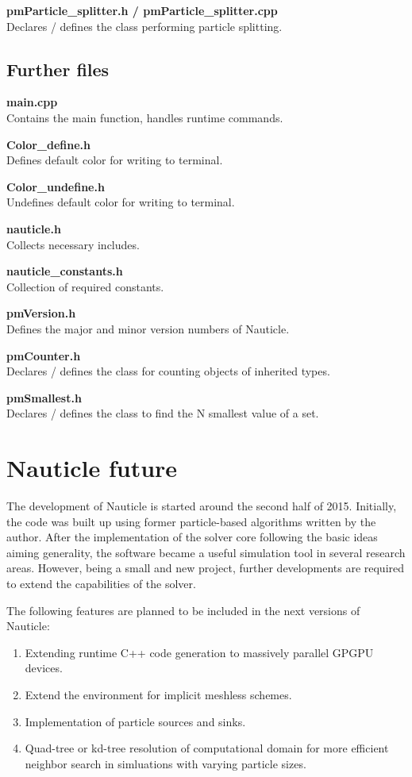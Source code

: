 \documentclass[a4paper,12pt,openany]{book}
\theoremstyle{break}
\begin{document}
\textbf{pmParticle\_splitter.h / pmParticle\_splitter.cpp} \\
Declares / defines the class performing particle splitting.

\subsection{Further files}

\textbf{main.cpp} \\
Contains the main function, handles runtime commands.

\textbf{Color\_define.h} \\
Defines default color for writing to terminal.

\textbf{Color\_undefine.h} \\
Undefines default color for writing to terminal.

\textbf{nauticle.h} \\
Collects necessary includes.

\textbf{nauticle\_constants.h} \\
Collection of required constants.

\textbf{pmVersion.h} \\
Defines the major and minor version numbers of Nauticle.

\textbf{pmCounter.h} \\
Declares / defines the class for counting objects of inherited types.

\textbf{pmSmallest.h} \\
Declares / defines the class to find the N smallest value of a set.

\section{Nauticle future}
The development of Nauticle is started around the second half of 2015. Initially, the code was built up using former particle-based algorithms written by the author. After the implementation of the solver core following the basic ideas aiming generality, the software became a useful simulation tool in several research areas. However, being a small and new project, further developments are required to extend the capabilities of the solver.

The following features are planned to be included in the next versions of Nauticle:
\begin{enumerate}
\item Extending runtime C++ code generation to massively parallel GPGPU devices.
\item Extend the environment for implicit meshless schemes.
\item Implementation of particle sources and sinks.
\item Quad-tree or kd-tree resolution of computational domain for more efficient neighbor search in simluations with varying particle sizes.
\end{enumerate}
\end{document}

